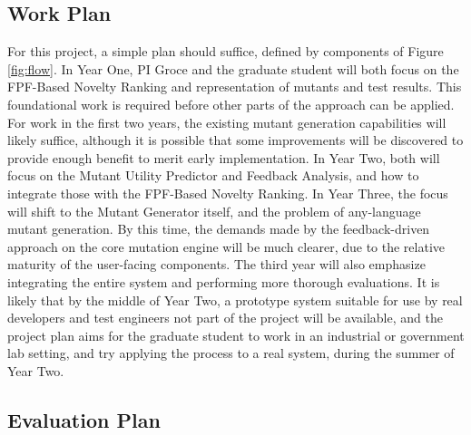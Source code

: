 \subsection{Work Plan}
\label{sec:workplan}


For this project, a simple plan should suffice, defined by components
of Figure \ref{fig:flow}.  In Year One, PI Groce and the graduate
student will both focus on the FPF-Based Novelty Ranking and
representation of mutants and test results.  This foundational work is
required before other parts of the approach can be applied.  For work
in the first two years, the existing mutant generation capabilities
will likely suffice, although it is possible that some improvements
will be discovered to provide enough benefit to merit early
implementation.  In Year
Two, both will focus on the Mutant Utility Predictor and Feedback
Analysis, and how to integrate those with the FPF-Based Novelty
Ranking.  In Year Three, the focus will shift to the Mutant Generator
itself, and the problem of any-language mutant generation.  By this
time, the demands made by the feedback-driven approach on the core
mutation engine will be much clearer, due to the relative maturity of
the user-facing components.  The third
year will also emphasize integrating the entire system and performing
more thorough evaluations.  It is likely that by the middle of Year
Two, a prototype system suitable for use by real developers and test
engineers not part of the project will be available, and the project
plan aims for the graduate student to work in an industrial or
government lab setting, and try applying the process to a real system,
during the summer of Year Two.

\subsection{Evaluation Plan}
\label{sec:evalplan}

